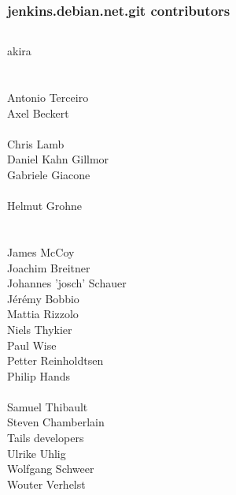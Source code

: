 \documentclass[14pt,aspectratio=169]{beamer}
\begin{document}
\begin{frame}
 \frametitle{jenkins.debian.net.git contributors}
 \begin{center}
  \begin{columns}
   \small
    {akira} \\
     \\
     \\
    {Antonio Terceiro} \\
    {Axel Beckert} \\
     \\
    {Chris Lamb} \\
    {Daniel Kahn Gillmor} \\
    {Gabriele Giacone} \\
     \\
    Helmut Grohne \\
     \\
     \\
    {James McCoy} \\
    {Joachim Breitner} \\
    {Johannes 'josch' Schauer} \\
    {Jérémy Bobbio} \\
    {Mattia Rizzolo} \\
    {Niels Thykier} \\
    {Paul Wise} \\
    {Petter Reinholdtsen} \\
    {Philip Hands} \\
     \\
    {Samuel Thibault} \\
    {Steven Chamberlain} \\
    {Tails developers} \\
    {Ulrike Uhlig} \\
    {Wolfgang Schweer} \\
    {Wouter Verhelst} \\
  \end{columns}
 \end{center}
\end{frame}
\end{document}
